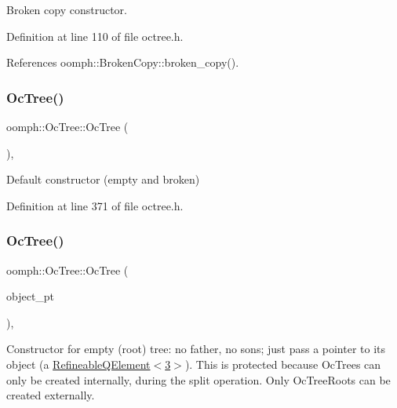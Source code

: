 Broken copy constructor. 



Definition at line 110 of file octree.\+h.



References oomph\+::\+Broken\+Copy\+::broken\+\_\+copy().

\mbox{\label{classoomph_1_1OcTree_abb830075e2f08aa68bf65a07089039ca}} 
\subsubsection{\texorpdfstring{Oc\+Tree()}{OcTree()}\hspace{0.1cm}{\footnotesize\ttfamily [2/4]}}
{\footnotesize\ttfamily oomph\+::\+Oc\+Tree\+::\+Oc\+Tree (\begin{DoxyParamCaption}{ }\end{DoxyParamCaption})\hspace{0.3cm}{\ttfamily [inline]}, {\ttfamily [protected]}}



Default constructor (empty and broken) 



Definition at line 371 of file octree.\+h.

\mbox{\label{classoomph_1_1OcTree_a2c0f7987566846a0451bdc1ed522a2d4}} 
\subsubsection{\texorpdfstring{Oc\+Tree()}{OcTree()}\hspace{0.1cm}{\footnotesize\ttfamily [3/4]}}
{\footnotesize\ttfamily oomph\+::\+Oc\+Tree\+::\+Oc\+Tree (\begin{DoxyParamCaption}\item[{\hyperlink{classoomph_1_1RefineableElement}{Refineable\+Element} $\ast$const \&}]{object\+\_\+pt }\end{DoxyParamCaption})\hspace{0.3cm}{\ttfamily [inline]}, {\ttfamily [protected]}}



Constructor for empty (root) tree\+: no father, no sons; just pass a pointer to its object (a \hyperlink{classoomph_1_1RefineableQElement_3_013_01_4}{Refineable\+Q\+Element$<$3$>$}). This is protected because Oc\+Trees can only be created internally, during the split operation. Only Oc\+Tree\+Roots can be created externally. 



